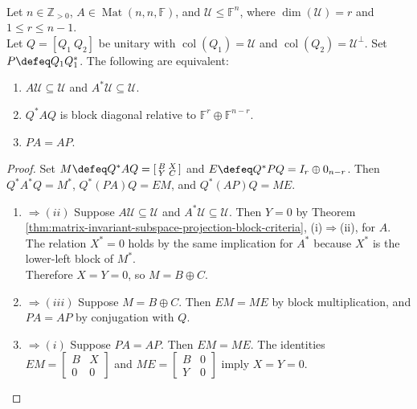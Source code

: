 \begin{corollary} \label{cor:reducing-subspace-projection-commutation} \\
Let $n\in\mathbb{Z}_{>0}$, $A\in\operatorname{Mat}(n,n,\mathbb{F})$, and $\mathcal{U}\leq\mathbb{F}^n$, where $\dim(\mathcal{U})=r$ and $1\leq r\leq n-1$.\\
Let $Q=[Q_1\ Q_2]$ be unitary with $\operatorname{col}(Q_1)=\mathcal{U}$ and $\operatorname{col}(Q_2)=\mathcal{U}^{\perp}$. Set $P\defeq Q_1Q_1^*$. The following are equivalent:
\begin{enumerate}[label=(\roman*)]
\setlength{\itemsep}{0pt}
\item $A\mathcal{U}\subseteq\mathcal{U}$ and $A^*\mathcal{U}\subseteq\mathcal{U}$.
\item $Q^*AQ$ is block diagonal relative to $\mathbb{F}^r\oplus\mathbb{F}^{n-r}$.
\item $PA=AP$.
\end{enumerate}
\begin{proof}
Set $M\defeq Q^*AQ=\left[\begin{smallmatrix}B&X\\Y&C\end{smallmatrix}\right]$ and $E\defeq Q^*PQ=I_r\oplus0_{n-r}$. Then $Q^*A^*Q=M^*$, $Q^*(PA)Q=EM$, and $Q^*(AP)Q=ME$.
\begin{enumerate}[label=(\roman*)]
\setlength{\itemsep}{0pt}
\item[$(i)$] $\Rightarrow (ii)$ Suppose $A\mathcal{U}\subseteq\mathcal{U}$ and $A^*\mathcal{U}\subseteq\mathcal{U}$. Then $Y=0$ by Theorem \ref{thm:matrix-invariant-subspace-projection-block-criteria}, (i)$\Rightarrow$(ii), for $A$.\\
The relation $X^*=0$ holds by the same implication for $A^*$ because $X^*$ is the lower-left block of $M^*$.\\
Therefore $X=Y=0$, so $M=B\oplus C$.
\item[$(ii)$] $\Rightarrow (iii)$ Suppose $M=B\oplus C$. Then $EM=ME$ by block multiplication, and $PA=AP$ by conjugation with $Q$.
\item[$(iii)$] $\Rightarrow (i)$ Suppose $PA=AP$. Then $EM=ME$. The identities $EM=\left[\begin{smallmatrix}B&X\\0&0\end{smallmatrix}\right]$ and $ME=\left[\begin{smallmatrix}B&0\\Y&0\end{smallmatrix}\right]$ imply $X=Y=0$.\\

\end{enumerate}
\end{proof}
\end{corollary}

